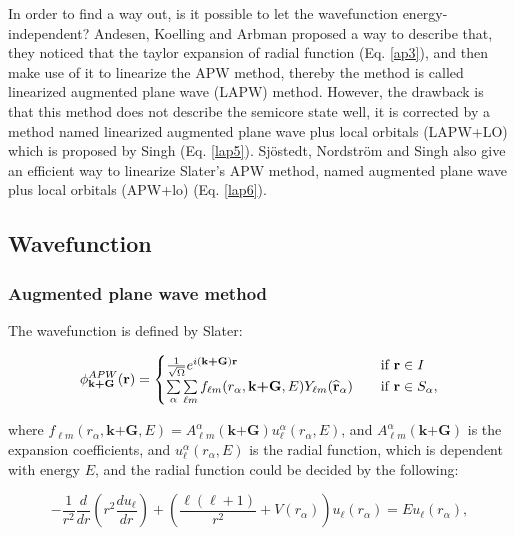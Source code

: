\documentclass[a4paper, 12pt, titlepage,oneside,drop]{kthesis}
\begin{document}
In order to find a way out, is it possible to let the wavefunction energy-independent? Andesen, Koelling and Arbman proposed a way to describe that,
they noticed that the taylor expansion of radial function (Eq. \ref{ap3}), and then make use of it to linearize the APW method, thereby the method is called linearized augmented plane wave (LAPW)
method. However, the drawback is that this method does not describe the semicore state well, it is corrected by a method named linearized augmented plane wave plus local orbitals (LAPW+LO) which is proposed by Singh (Eq. \ref{lap5}).
Sjöstedt, Nordström and Singh also give an efficient way to linearize Slater's APW method, named augmented plane wave plus local orbitals (APW+lo) (Eq. \ref{lap6}). 

\subsection{Wavefunction}
\subsubsection{Augmented plane wave method}

The wavefunction is defined by Slater:

\begin{equation}\label{ap111}
\phi^{APW}_{\textbf {k+G}} ({\textbf r})= 
\begin{cases} \frac {1}{\sqrt{\Omega}} e^{i({ \textbf {k+G}}) {\textbf r}} & \quad \mbox{if ${\textbf r} \in I $} 
\\
\sumg<\alpha>\sum\limits_{{\ell}m} f_{{\ell}{m}} (r_{\alpha},{\textbf {k+G}}, E) Y_{{\ell}m}(\widehat{{\textbf r}}_{\alpha})  & \quad \mbox{if $ {\textbf r} \in S_\alpha, $}\\ 
\end{cases}
\end{equation}

where $f_{{\ell}{m}} (r_{\alpha},\textbf{k+G} ,E) =  A _{{\ell}m}^{\alpha} ( \textbf {k+G}) u_{{\ell}}^{\alpha}(r_{\alpha}, E)$, and $A _{{\ell}m}^{\alpha} (\textbf {k+G}) $ is the expansion coefficients, and $u_{{\ell}}^{\alpha} (r_{\alpha}, E)$  is the radial function, which is dependent with energy $E$, and the
radial function could be decided by the following:

\begin{equation}\label{ap2}
-\frac{1}{r^2}  \frac{d}{dr} (r^2 \frac{du_{\ell}}{dr})+ \left(\frac{\ell(\ell+1)}{r^2}+V(r_{\alpha})\right)u_{\ell}(r_{\alpha}) = E u_{\ell}(r_{\alpha}),
\end{equation}
\end{document}
